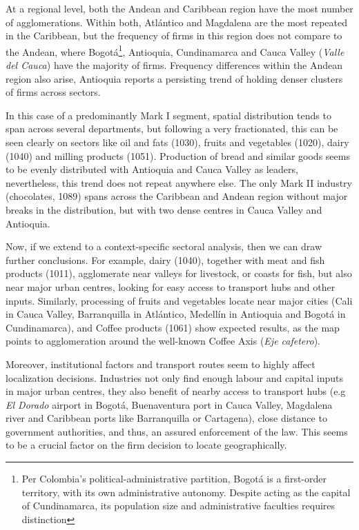 \documentclass[12pt,a4paper]{article}
\begin{document}
At a regional level, both the Andean and Caribbean region have the most number of agglomerations. Within both, Atlántico and Magdalena are the most repeated in the Caribbean, but the frequency of firms in this region does not compare to the Andean, where Bogotá\footnote{Per Colombia's political-administrative partition, Bogotá is a first-order territory, with its own administrative autonomy. Despite acting as the capital of Cundinamarca, its population size and administrative faculties requires distinction}, Antioquia, Cundinamarca and Cauca Valley (\textit{Valle del Cauca}) have the majority of firms. Frequency differences within the Andean region also arise, Antioquia reports a persisting trend of holding denser clusters of firms across sectors.

In this case of a predominantly Mark I segment, spatial distribution tends to span across several departments, but following a very fractionated, this can be seen clearly on sectors like oil and fats (1030), fruits and vegetables (1020), dairy (1040) and milling products (1051). Production of bread and similar goods seems to be evenly distributed with Antioquia and Cauca Valley as leaders, nevertheless, this trend does not repeat anywhere else. The only Mark II industry (chocolates, 1089) spans across the Caribbean and Andean region without major breaks in the distribution, but with two dense centres in Cauca Valley and Antioquia.

Now, if we extend to a context-specific sectoral analysis, then we can draw further conclusions. For example, dairy (1040), together with meat and fish products (1011), agglomerate near valleys for livestock, or coasts for fish, but also near major urban centres, looking for easy access to transport hubs and other inputs. Similarly, processing of fruits and vegetables locate near major cities (Cali in Cauca Valley, Barranquilla in Atlántico, Medellín in Antioquia and Bogotá in Cundinamarca), and Coffee products (1061) show expected results, as the map points to agglomeration around the well-known Coffee Axis (\textit{Eje cafetero}). 

Moreover, institutional factors and transport routes seem to highly affect localization decisions. Industries not only find enough labour and capital inputs in major urban centres, they also benefit of nearby access to transport hubs (e.g \textit{El Dorado} airport in Bogotá, Buenaventura port in Cauca Valley, Magdalena river and Caribbean ports like Barranquilla or Cartagena), close distance to government authorities, and thus, an assured enforcement of the law. This seems to be a crucial factor on the firm decision to locate geographically.
\end{document}
